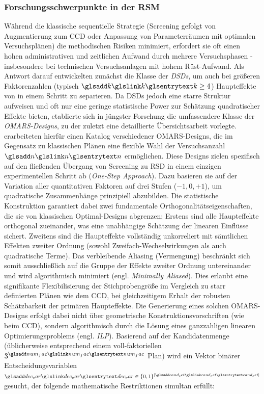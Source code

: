 \subsubsection{Forschungsschwerpunkte in der \ac{RSM}}
Während die klassische sequentielle Strategie (Screening gefolgt von Augmentierung zum \ac{CCD} oder Anpassung von Parameterräumen mit optimalen Versuchsplänen) die methodischen Risiken minimiert, erfordert sie oft einen hohen administrativen und zeitlichen Aufwand durch mehrere Versuchsphasen - insbesondere bei technischen Versuchsanlagen mit hohem Rüst-Aufwand.
Als Antwort darauf entwickelten \textcite{Jones.2011} zunächst die Klasse der \textit{\acp{DSD}}, um auch bei größeren Faktorenzahlen (typisch $\sym{k} \geq 4$) Haupteffekte von  in einem Schritt zu separieren.
Da \acp{DSD} jedoch eine starre Struktur aufweisen und oft nur eine geringe statistische Power zur Schätzung quadratischer Effekte bieten, etablierte sich in jüngster Forschung die umfassendere Klasse der \textit{\ac{OMARS}-Designs}, zu der \textcite{Goos.2025} zuletzt eine detaillierte Übersichtsarbeit vorlegte.
\textcite{NunezAres.2020} erarbeiteten hierfür einen Katalog verschiedener \ac{OMARS}-Designs, die im Gegensatz zu klassischen Plänen eine flexible Wahl der Versuchsanzahl $\sym{n}$ ermöglichen.
Diese Designs zielen spezifisch auf den fließenden Übergang von Screening zu \ac{RSD} in einem einzigen experimentellen Schritt ab (\textit{One-Step Approach}).
Dazu basieren sie auf der Variation aller quantitativen Faktoren auf drei Stufen ($-1, 0, +1$), um quadratische Zusammenhänge prinzipiell abzubilden.
Die statistische Konstruktion garantiert dabei zwei fundamentale Orthogonalitätseigenschaften, die sie von klassischen Optimal-Designs abgrenzen:
Erstens sind alle Haupteffekte orthogonal zueinander, was eine unabhängige Schätzung der linearen Einflüsse sichert.
Zweitens sind die Haupteffekte vollständig unkorreliert mit sämtlichen Effekten zweiter Ordnung (sowohl Zweifach-Wechselwirkungen als auch quadratische Terme).
Das verbleibende Aliasing (Vermengung) beschränkt sich somit ausschließlich auf die Gruppe der Effekte zweiter Ordnung untereinander und wird algorithmisch minimiert (engl. \textit{Minimally Aliased}).
Dies erlaubt eine signifikante Flexibilisierung der Stichprobengröße im Vergleich zu starr definierten Plänen wie dem \ac{CCD}, bei gleichzeitigem Erhalt der robusten Schätzbarkeit der primären Haupteffekte.
Die Generierung eines solchen \ac{OMARS}-Designs erfolgt dabei nicht über geometrische Konstruktionsvorschriften (wie beim \ac{CCD}), sondern algorithmisch durch die Lösung eines ganzzahligen linearen Optimierungsproblems (engl. \textit{\ac{ILP}}).
Basierend auf der Kandidatenmenge  (üblicherweise entsprechend einem voll-faktoriellen $3^{\sym{num_fac}}$ Plan) wird ein Vektor binärer Entscheidungsvariablen $\sym{dec_var} \in \{0,1\}^{|\sym{cand_set}|}$ gesucht, der folgende mathematische Restriktionen simultan erfüllt:

